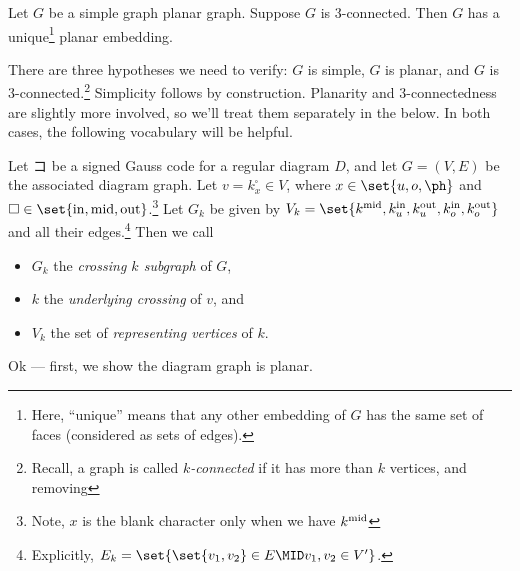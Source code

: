 \begin{theorem}[Whitney]\label{thm:whitney}
  Let $G$ be a simple graph planar graph. Suppose $G$ is
  $3$-connected. Then $G$ has a unique\footnote{Here, ``unique'' means
    that any other embedding of $G$ has the same set of faces
    (considered as sets of edges).} planar embedding.
\end{theorem}
There are three hypotheses we need to verify: $G$ is simple, $G$ is
planar, and $G$ is 3-connected.\footnote{Recall, a graph is called
  \emph{$k$-connected} if it has more than $k$ vertices, and removing
} Simplicity follows by construction. Planarity and $3$-connectedness
are slightly more involved, so we'll treat them separately in the
below. In both cases, the following vocabulary will be helpful.
\begin{definition}
  Let $コ$ be a signed Gauss code for a regular diagram $D$, and let $G
  = (V,E)$ be the associated diagram graph. Let $v = k_x^{\square} \in
  V$, where $x \in \set{u,o,\ph}$ and $\square \in \set{{\rm in, mid,
      out}}$.\footnote{Note, $x$ is the blank character only when we
    have $k^{\rm mid}$} Let $G_k$ be given by $V_k = \set{k^{\rm
      mid}, k_u^{\rm in}, k_u^{\rm out}, k_o^{\rm in}, k_o^{\rm out}}$
  and all their edges.\footnote{Explicitly, $E_k = \set{\set{v_1,
        v_2} \in E \MID v_1, v_2 \in V'}$.} Then we call
  \begin{itemize}
    \item $G_k$ the \emph{crossing $k$ subgraph} of $G$,
    \item $k$ the \emph{underlying crossing} of $v$, and
    \item $V_k$ the set of \emph{representing vertices} of $k$.
      \qedhere
  \end{itemize}
\end{definition}
Ok --- first, we show the diagram graph is planar.
